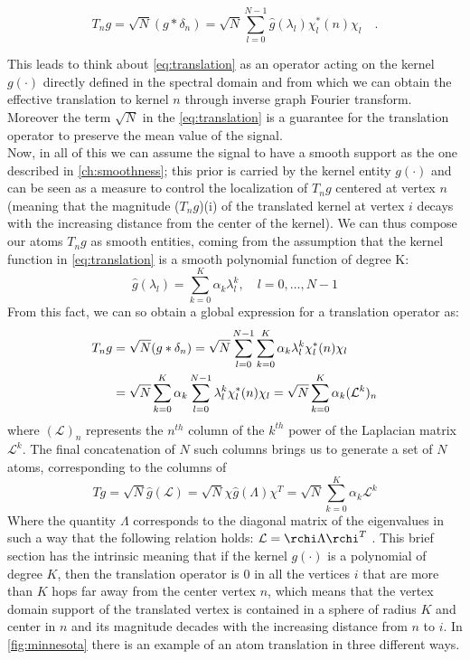 \begin{equation}
T_n g = \sqrt{N}(g * \delta_n) = \sqrt{N}\sum_{l=0}^{N-1}\hat{g}(\lambda_l)\chi_l^{*}(n)\chi_l \quad .
\label{eq:translation}
\end{equation}

This leads to think about \autoref{eq:translation} as an operator acting on the kernel $g(\cdot)$ directly defined in the spectral domain and from which we can obtain the effective translation to kernel $n$ through inverse graph Fourier transform. Moreover the term $\sqrt{N}$ in the \autoref{eq:translation} is a guarantee for the translation operator to preserve the mean value of the signal.\\

Now, in all of this we can assume the signal to have a smooth support as the one described in \autoref{ch:smoothness}; this prior is carried by the kernel entity  $g(\cdot)$ and can be seen as a measure to control the localization of $T_n g$ centered at vertex $n$ (meaning that the magnitude ($T_n g$)(i) of the translated kernel at vertex $i$ decays with the increasing distance from the center of the kernel). We can thus compose our atoms $T_n g$ as smooth entities, coming from the assumption that the kernel function in \autoref{eq:translation} is a smooth polynomial function of degree K:
\begin{equation}
\hat{g}(\lambda_l) = \sum_{k=0}^{K} \alpha_k\lambda_l^k, \quad l = 0,\dots,N-1
\end{equation}
From this fact, we can so obtain a global expression for a translation operator as:
\begin{align}
T_n g & = \sqrt{N}(g * \delta_n) = \sqrt{N}\sum_{l=0}^{N-1}\sum_{k=0}^{K}\alpha_k\lambda_l^k\chi_l^*(n)\chi_l \notag\\
&= \sqrt{N}\sum_{k=0}^{K}\alpha_k\sum_{l=0}^{N-1}\lambda_l^k\chi_l^*(n)\chi_l = \sqrt{N}\sum_{k=0}^{K}\alpha_k (\mathcal{L}^k)_n
\end{align}
where $(\mathcal{L})_n$ represents the $n^{th}$ column of the $k^{th}$ power of the Laplacian matrix $\mathcal{L}^k$. The final concatenation of $N$ such columns brings us to generate a set of $N$ atoms, corresponding to the columns of
\begin{equation}
Tg = \sqrt{N}\hat{g}(\mathcal{L}) = \sqrt{N}\chi \hat{g}(\Lambda)\chi^T = \sqrt{N}\sum_{k=0}^{K}\alpha_k\mathcal{L}^k
\label{eq:tg}
\end{equation}
Where the quantity $\Lambda$ corresponds to the diagonal matrix of the eigenvalues in such a way that the following relation holds: $\mathcal{L} = \rchi \Lambda \rchi^T$ \cite{Dong2016}. This brief section has the intrinsic meaning that if the kernel $g(\cdot)$ is a polynomial of degree $K$, then the translation operator is $0$ in all the vertices $i$ that are more than $K$ hops far away from the center vertex $n$, which means that the vertex domain support of the translated vertex is contained in a sphere of radius $K$ and center in $n$ and its magnitude decades with the increasing distance from $n$ to $i$.
In \autoref{fig:minnesota} there is an example of an atom translation in three different ways.

